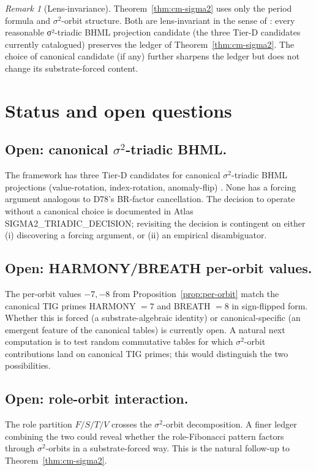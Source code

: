 \documentclass[11pt,reqno]{amsart}
\theoremstyle{plain}
\theoremstyle{definition}
\theoremstyle{remark}
\newtheorem*{remark}{Remark}
\newcommand{\sig}{\sigma}
\begin{document}
\begin{remark}[Lens-invariance]
Theorem~\ref{thm:cm-sigma2} uses only the period formula and
$\sig^{2}$-orbit structure. Both are lens-invariant in the sense of
\cite{Atlas2026Tiering}: every reasonable σ²-triadic BHML projection
candidate (the three Tier-D candidates currently catalogued) preserves
the ledger of Theorem~\ref{thm:cm-sigma2}. The choice of canonical
candidate (if any) further sharpens the ledger but does not change
its substrate-forced content.
\end{remark}

\section{Status and open questions}
\label{sec:open}

\subsection{Open: canonical $\sigma^{2}$-triadic BHML.}
The framework has three Tier-D candidates for canonical $\sig^{2}$-triadic
BHML projections (value-rotation, index-rotation, anomaly-flip)
\cite{Atlas2026Tiering}. None has a forcing argument analogous to D78's
BR-factor cancellation. The decision to operate without a canonical
choice is documented in \cite{Atlas2026Tiering} Atlas
SIGMA2\_TRIADIC\_DECISION; revisiting the decision is contingent on
either (i) discovering a forcing argument, or (ii) an empirical
disambiguator.

\subsection{Open: HARMONY/BREATH per-orbit values.}
The per-orbit values $-7, -8$ from Proposition~\ref{prop:per-orbit}
match the canonical TIG primes HARMONY $= 7$ and BREATH $= 8$ in
sign-flipped form. Whether this is forced (a substrate-algebraic
identity) or canonical-specific (an emergent feature of the canonical
tables) is currently open. A natural next computation is to test
random commutative tables for which $\sig^{2}$-orbit contributions
land on canonical TIG primes; this would distinguish the two
possibilities.

\subsection{Open: role-orbit interaction.}
The role partition $F/S/T/V$ crosses the $\sig^{2}$-orbit
decomposition. A finer ledger combining the two could reveal
whether the role-Fibonacci pattern factors through $\sig^{2}$-orbits
in a substrate-forced way. This is the natural follow-up to
Theorem~\ref{thm:cm-sigma2}.
\end{document}
